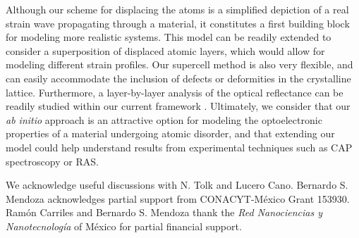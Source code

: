 \documentclass[pss]{wiley2sp} %
\begin{document}
Although our scheme for displacing the atoms is a simplified depiction of a real
strain wave propagating through a material, it constitutes a first building
block for modeling more realistic systems. This model can be readily extended to
consider a superposition of displaced atomic layers, which would allow for
modeling different strain profiles. Our supercell method is also very flexible,
and can easily accommodate the inclusion of defects or deformities in the
crystalline lattice. 
{\color{red}Furthermore, a layer-by-layer analysis of the optical reflectance
can be readily studied within our current framework \cite{mendozaPRB06}.}
Ultimately, we consider that our \emph{ab initio} approach
is an attractive option for modeling the optoelectronic properties of a material
undergoing atomic disorder, and that extending our model could help understand
results from experimental techniques such as CAP spectroscopy or RAS.


\begin{acknowledgement}
We acknowledge useful discussions with {\color{red}N. Tolk} and Lucero Cano. Bernardo S.
Mendoza acknowledges partial support from CONACYT-M\'exico Grant 153930. Ram\'on
Carriles and Bernardo S. Mendoza thank the \emph{Red Nanociencias y
Nanotecnolog\'ia} of M\'exico for partial financial support.
\end{acknowledgement}


% 


\providecommand{\WileyBibTextsc}{}
\let\textsc\WileyBibTextsc
\providecommand{\othercit}{}
\providecommand{\jr}[1]{#1}
\providecommand{\etal}{~et~al.}
\end{document}
